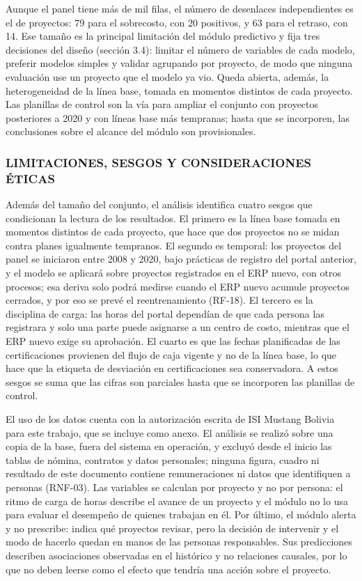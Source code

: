 Aunque el panel tiene más de mil filas, el número de desenlaces independientes es el de proyectos: 79 para el sobrecosto, con 20 positivos, y 63 para el retraso, con 14. Ese tamaño es la principal limitación del módulo predictivo y fija tres decisiones del diseño (sección 3.4): limitar el número de variables de cada modelo, preferir modelos simples y validar agrupando por proyecto, de modo que ninguna evaluación use un proyecto que el modelo ya vio. Queda abierta, además, la heterogeneidad de la línea base, tomada en momentos distintos de cada proyecto. Las planillas de control son la vía para ampliar el conjunto con proyectos posteriores a 2020 y con líneas base más tempranas; hasta que se incorporen, las conclusiones sobre el alcance del módulo son provisionales.

\subsubsection{LIMITACIONES, SESGOS Y CONSIDERACIONES ÉTICAS}

Además del tamaño del conjunto, el análisis identifica cuatro sesgos que condicionan la lectura de los resultados. El primero es la línea base tomada en momentos distintos de cada proyecto, que hace que dos proyectos no se midan contra planes igualmente tempranos. El segundo es temporal: los proyectos del panel se iniciaron entre 2008 y 2020, bajo prácticas de registro del portal anterior, y el modelo se aplicará sobre proyectos registrados en el ERP nuevo, con otros procesos; esa deriva solo podrá medirse cuando el ERP nuevo acumule proyectos cerrados, y por eso se prevé el reentrenamiento (RF-18). El tercero es la disciplina de carga: las horas del portal dependían de que cada persona las registrara y solo una parte puede asignarse a un centro de costo, mientras que el ERP nuevo exige su aprobación. El cuarto es que las fechas planificadas de las certificaciones provienen del flujo de caja vigente y no de la línea base, lo que hace que la etiqueta de desviación en certificaciones sea conservadora. A estos sesgos se suma que las cifras son parciales hasta que se incorporen las planillas de control.

El uso de los datos cuenta con la autorización escrita de ISI Mustang Bolivia para este trabajo, que se incluye como anexo. El análisis se realizó sobre una copia de la base, fuera del sistema en operación, y excluyó desde el inicio las tablas de nómina, contratos y datos personales; ninguna figura, cuadro ni resultado de este documento contiene remuneraciones ni datos que identifiquen a personas (RNF-03). Las variables se calculan por proyecto y no por persona: el ritmo de carga de horas describe el avance de un proyecto y el módulo no lo usa para evaluar el desempeño de quienes trabajan en él. Por último, el módulo alerta y no prescribe: indica qué proyectos revisar, pero la decisión de intervenir y el modo de hacerlo quedan en manos de las personas responsables. Sus predicciones describen asociaciones observadas en el histórico y no relaciones causales, por lo que no deben leerse como el efecto que tendría una acción sobre el proyecto.
